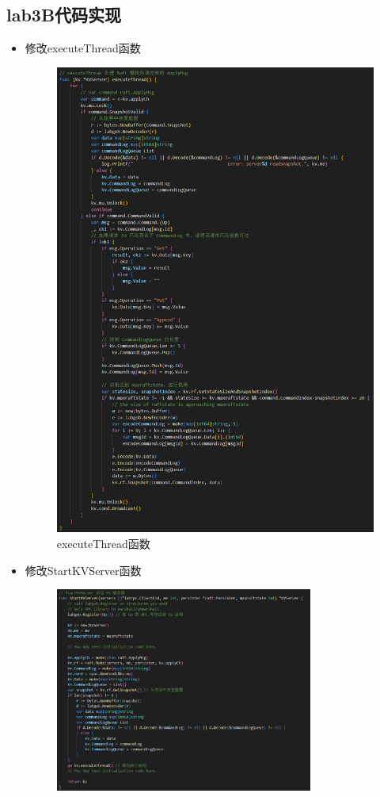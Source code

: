 \documentclass[]{article}
\begin{document}
	\subsection{lab3B代码实现}
	\begin{itemize}
		\item 修改executeThread函数
		\begin{figure}[H]
			\centering
			\includegraphics[height=0.85\textheight]{./3B/executeThread.png}
			\caption{executeThread函数}
		\end{figure}
		\item 修改StartKVServer函数
		\begin{figure}[H]
			\centering
			\includegraphics[width=0.8\textwidth]{./3B/StartKVServer.png}

\end{figure}
\end{itemize}
\end{document}
